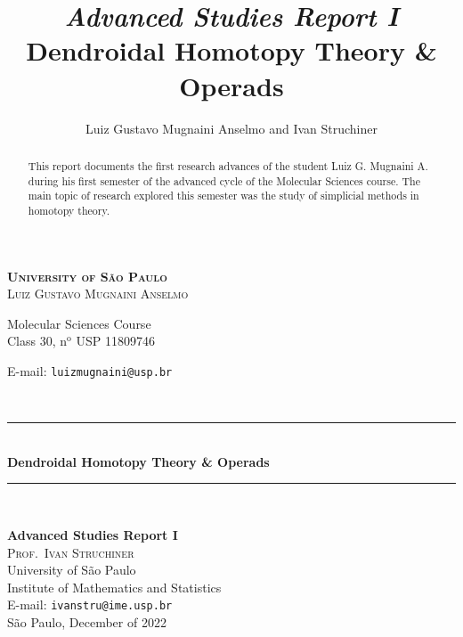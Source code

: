 \documentclass[11pt, reqno]{amsart}
\newcommand{\HRule}{\rule{\linewidth}{0.5mm}} %
\theoremstyle{definition}
\begin{document}
\begin{titlepage}
 \vfill
  \begin{center}
       \textsc{\LARGE \textbf{University of São Paulo}} \\[2.0cm]

       \vskip 0.5cm
       \textsc{\large Luiz Gustavo Mugnaini Anselmo}

       {\normalsize Molecular Sciences Course \\
         Class 30, n\(^{\text{o}}\)
         USP 11809746

       E-mail: \texttt{luizmugnaini@usp.br}}\\[2.0cm]

       \HRule\\
       \vskip 0.5cm
       {\LARGE \textbf{Dendroidal Homotopy Theory \& Operads}}
       \HRule\\[1.5cm]

       \hspace{.45\textwidth}
       \begin{minipage}{.5\textwidth}
       \normalsize \textbf{Advanced Studies Report I}\\[0.5cm]

       \textsc{\large Prof.~Ivan Struchiner}\\
       University of São Paulo \\
       Institute of Mathematics and Statistics \\
       E-mail: \texttt{ivanstru@ime.usp.br}\\[1cm]

       \normalsize São Paulo, December of 2022
       \end{minipage}
  \end{center}
\end{titlepage}

\title[Dendroidal Homotopy Theory \& Operads]{%
{\footnotesize\sl Advanced Studies Report I} \\ \smallskip
  Dendroidal Homotopy Theory \& Operads
}%

\author{%
  Luiz Gustavo Mugnaini Anselmo and Ivan Struchiner
}%

\address{%
  Institute of Mathematics and Statistics, University of São
  Paulo, Rua do Matão 1010, 05508--090~São Paulo, SP
}%


\begin{abstract}
This report documents the first research advances of the student Luiz
G. Mugnaini A. during his first semester of the advanced cycle of the Molecular
Sciences course. The main topic of research explored this semester was the
study of simplicial methods in homotopy theory.
\end{abstract}
\maketitle
\end{document}
